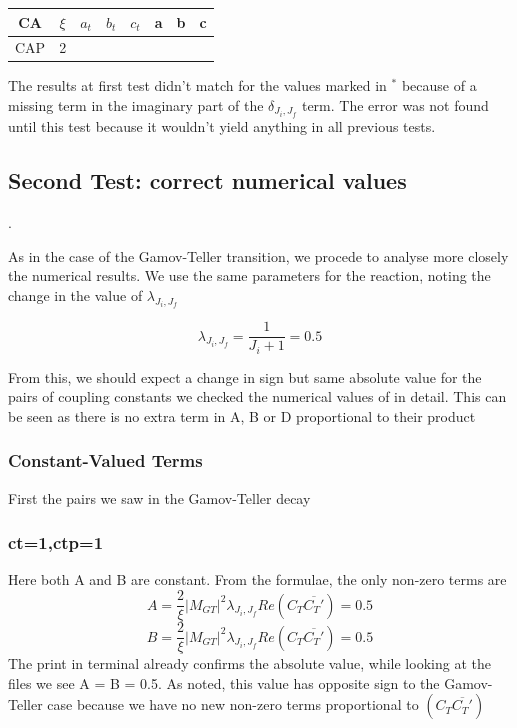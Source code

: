\documentclass[twocolumn]{article}
\begin{document}
\begin{table}[H]
	\begin{tabular}{|c|c|c|c|c|c|c|c|}
		\hline
		CA & $\xi $& $a_t$ & $b_t$ & $c_t$ & a & b & c \\
		\hline
		CAP & 2 &   &   &   &   &   &   \\
		\hline
	\end{tabular}
\end{table}


The results at first test didn't match for the values marked in $^\ast$ because of a missing term in the imaginary part of the $\delta_{J_i,J_f}$ term. The error was not found until this test because it wouldn't yield anything in all previous tests. 

\subsection{Second Test: correct numerical values}.

As in the case of the Gamov-Teller transition, we procede to analyse more closely the numerical results. We use the same parameters for the reaction, noting the change in the value of $\lambda_{J_i,J_f}$  

$$\lambda_{J_i,J_f} = \frac{1}{J_i+1} = 0.5$$

From this, we should expect a change in sign but same absolute value for the pairs of coupling constants we checked the numerical values of in detail. This can be seen as there is no extra term in A, B or D proportional to their product

\subsubsection{Constant-Valued Terms}

First the pairs we saw in the Gamov-Teller decay

\subsubsection*{ct=1,ctp=1}

Here both A and B are constant. From the formulae, the only non-zero terms are 
$$A = \frac{2}{\xi}|M_{GT}|^2\lambda_{J_i,J_f}Re(C_T\overline{C_T'}) = 0.5$$
$$B = \frac{2}{\xi}|M_{GT}|^2\lambda_{J_i,J_f}Re(C_T\overline{C_T'}) = 0.5$$
The print in terminal already confirms the absolute value, while looking at the files we see A = B = 0.5. As noted, this value has opposite sign to the Gamov-Teller case because we have no new non-zero terms proportional to $(C_T\overline{C_T'})$
\end{document}
